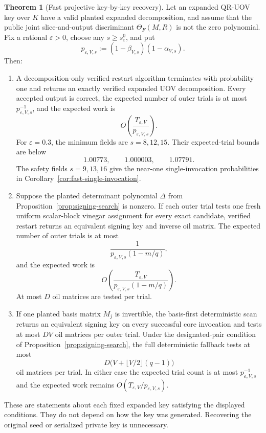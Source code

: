 \documentclass[11pt,a4paper]{article}
\theoremstyle{definition}
\newtheorem{theorem}{Theorem}[section]
\theoremstyle{remark}
\newcommand{\QRUOV}{\textsf{QR-UOV}}
\begin{document}
\begin{theorem}[Fast projective key-by-key recovery]\label{thm:attack}
Let an expanded \QRUOV{} key over $K$ have a valid planted expanded decomposition, and assume that the public joint slice-and-output discriminant $\Theta_F(M,R)$ is not the zero polynomial.  Fix a rational $\varepsilon>0$, choose any $s\ge s_\varepsilon^0$, and put
\[
 p_{\varepsilon,V,s}:=(1-\beta_{V,s})(1-\alpha_{V,s}).
\]
Then:
\begin{enumerate}
\item A decomposition-only verified-restart algorithm terminates with probability one and returns an exactly verified expanded UOV decomposition.  Every accepted output is correct, the expected number of outer trials is at most $p_{\varepsilon,V,s}^{-1}$, and the expected work is
\begin{equation}\label{eq:expected-decomposition}
 O\!\left(\frac{T_{\varepsilon,V}}{p_{\varepsilon,V,s}}\right).
\end{equation}
For $\varepsilon=0.3$, the minimum fields are $s=8,12,15$.  Their expected-trial bounds are below
\[
1.00773,\qquad1.000003,\qquad1.07791.
\]
The safety fields $s=9,13,16$ give the near-one single-invocation probabilities in Corollary~\ref{cor:fast-single-invocation}.

\item Suppose the planted determinant polynomial $\Delta$ from Proposition~\ref{prop:signing-search} is nonzero.  If each outer trial tests one fresh uniform scalar-block vinegar assignment for every exact candidate, verified restart returns an equivalent signing key and inverse oil matrix.  The expected number of outer trials is at most
\[
 \frac{1}{p_{\varepsilon,V,s}(1-m/q)},
\]
and the expected work is
\begin{equation}\label{eq:expected-attack-randomized}
 O\!\left(\frac{T_{\varepsilon,V}}{p_{\varepsilon,V,s}(1-m/q)}\right).
\end{equation}
At most $D$ oil matrices are tested per trial.

\item If one planted basis matrix $M_j$ is invertible, the basis-first deterministic scan returns an equivalent signing key on every successful core invocation and tests at most $DV$ oil matrices per outer trial.  Under the designated-pair condition of Proposition~\ref{prop:signing-search}, the full deterministic fallback tests at most
\[
 D\bigl(V+\lfloor V/2\rfloor(q-1)\bigr)
\]
oil matrices per trial.  In either case the expected trial count is at most $p_{\varepsilon,V,s}^{-1}$ and the expected work remains $O(T_{\varepsilon,V}/p_{\varepsilon,V,s})$.
\end{enumerate}
These are statements about each fixed expanded key satisfying the displayed conditions.  They do not depend on how the key was generated.  Recovering the original seed or serialized private key is unnecessary.
\end{theorem}
\end{document}
